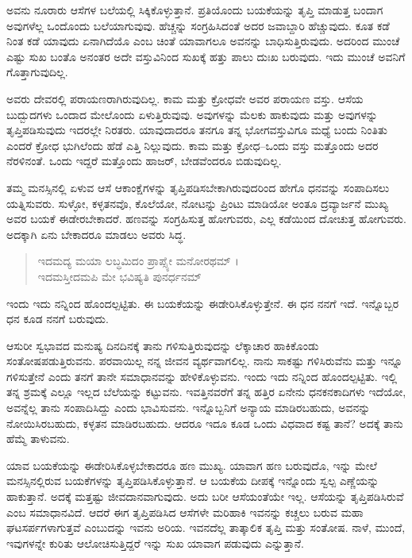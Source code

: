 ಅವನು ನೂರಾರು ಆಸೆಗಳ ಬಲೆಯಲ್ಲಿ ಸಿಕ್ಕಿಕೊಳ್ಳುತ್ತಾನೆ. ಪ್ರತಿಯೊಂದು ಬಯಕೆಯನ್ನು ತೃಪ್ತಿ ಮಾಡುತ್ತ ಬಂದಾಗ ಅವುಗಳೆಲ್ಲ ಒಂದೊಂದು ಬಲೆಯಾಗುವುವು. ಹೆಚ್ಚನ್ನು ಸಂಗ್ರಹಿಸಿದಂತೆ ಅದರ ಜವಾಬ್ದಾರಿ ಹೆಚ್ಚುವುದು. ಕೂತ ಕಡೆ ನಿಂತ ಕಡೆ ಯಾವುದು ಏನಾಗಿದೆಯೊ ಎಂಬ ಚಿಂತೆ ಯಾವಾಗಲೂ ಅವನನ್ನು ಬಾಧಿಸುತ್ತಿರುವುದು. ಅದರಿಂದ ಮುಂಚೆ ಎಷ್ಟು ಸುಖ ಬಂತೊ ಅನಂತರ ಅದೇ ವಸ್ತುವಿನಿಂದ ಸುಖಕ್ಕೆ ಹತ್ತು ಪಾಲು ದುಃಖ ಬರುವುದು. ಇದು ಮುಂಚೆ ಅವನಿಗೆ ಗೊತ್ತಾಗುವುದಿಲ್ಲ.

ಅವರು ದೇವರಲ್ಲಿ ಪರಾಯಣರಾಗಿರುವುದಿಲ್ಲ. ಕಾಮ ಮತ್ತು ಕ್ರೋಧವೇ ಅವರ ಪರಾಯಣ ವಸ್ತು. ಆಸೆಯ ಬುದ್ಬುದಗಳು ಒಂದಾದ ಮೇಲೊಂದು ಏಳುತ್ತಿರುವುವು. ಅವುಗಳನ್ನು ಮೆಲಕು ಹಾಕುವುದು ಮತ್ತು ಅವುಗಳನ್ನು ತೃಪ್ತಿಪಡಿಸುವುದು ಇದರಲ್ಲೇ ನಿರತರು. ಯಾವುದಾದರೂ ತನಗೂ ತನ್ನ ಭೋಗವಸ್ತುವಿಗೂ ಮಧ್ಯೆ ಬಂದು ನಿಂತಿತು ಎಂದರೆ ಕ್ರೋಧ ಭುಗಿಲೆಂದು ಹೆಡೆ ಎತ್ತಿ ನಿಲ್ಲುವುದು. ಕಾಮ ಮತ್ತು ಕ್ರೋಧ–ಒಂದು ವಸ್ತು ಮತ್ತೊಂದು ಅದರ ನೆರಳಿನಂತೆ. ಒಂದು ಇದ್ದರೆ ಮತ್ತೊಂದು ಹಾಜರ್, ಬೇಡವೆಂದರೂ ಬಿಡುವುದಿಲ್ಲ.

ತಮ್ಮ ಮನಸ್ಸಿನಲ್ಲಿ ಏಳುವ ಆಸೆ ಆಕಾಂಕ್ಷೆಗಳನ್ನು ತೃಪ್ತಿಪಡಿಸಬೇಕಾಗಿರುವುದರಿಂದ ಹೇಗೊ ಧನವನ್ನು ಸಂಪಾದಿಸಲು ಯತ್ನಿಸುವರು. ಸುಳ್ಳೋ, ಕಳ್ಳತನವೊ, ಕೊಲೆಯೋ, ನೋಟನ್ನು ಪ್ರಿಂಟು ಮಾಡಿಯೋ ಅಂತೂ ದ್ರವ್ಯಾರ್ಜನೆ ಮುಖ್ಯ ಅವರ ಬಯಕೆ ಈಡೇರಬೇಕಾದರೆ. ಹಣವನ್ನು ಸಂಗ್ರಹಿಸುತ್ತ ಹೋಗುವರು, ಎಲ್ಲ ಕಡೆಯಿಂದ ದೋಚುತ್ತ ಹೋಗುವರು. ಅದಕ್ಕಾಗಿ ಏನು ಬೇಕಾದರೂ ಮಾಡಲು ಅವರು ಸಿದ್ಧ.

\begin{verse}
ಇದಮದ್ಯ ಮಯಾ ಲಬ್ಧಮಿದಂ ಪ್ರಾಪ್ಸ್ಯೇ ಮನೋರಥಮ್ ।\\ಇದಮಸ್ತೀದಮಪಿ ಮೇ ಭವಿಷ್ಯತಿ ಪುನರ್ಧನಮ್ 
\end{verse}

{\small ಇಂದು ಇದು ನನ್ನಿಂದ ಹೊಂದಲ್ಪಟ್ಟಿತು. ಈ ಬಯಕೆಯನ್ನು ಈಡೇರಿಸಿಕೊಳ್ಳುತ್ತೇನೆ. ಈ ಧನ ನನಗೆ ಇದೆ. ಇನ್ನೊಬ್ಬರ ಧನ ಕೂಡ ನನಗೆ ಬರುವುದು.}

ಆಸುರೀ ಸ್ವಭಾವದ ಮನುಷ್ಯ ದಿನದಿನಕ್ಕೆ ತಾನು ಗಳಿಸುತ್ತಿರುವುದನ್ನು ಲೆಕ್ಕಾಚಾರ ಹಾಕಿಕೊಂಡು ಸಂತೋಷಪಡುತ್ತಿರುವನು. ಪರವಾಯಿಲ್ಲ ನನ್ನ ಜೀವನ ವ್ಯರ್ಥವಾಗಲಿಲ್ಲ. ನಾನು ಸಾಕಷ್ಟು ಗಳಿಸಿರುವೆನು ಮತ್ತು ಇನ್ನೂ ಗಳಿಸುತ್ತೇನೆ ಎಂದು ತನಗೆ ತಾನೇ ಸಮಾಧಾನವನ್ನು ಹೇಳಿಕೊಳ್ಳುವನು. ಇಂದು ಇದು ನನ್ನಿಂದ ಹೊಂದಲ್ಪಟ್ಟಿತು. ಇಲ್ಲಿ ತನ್ನ ಶ್ರಮಕ್ಕೆ ಎಲ್ಲೂ ಇಲ್ಲದ ಬೆಲೆಯನ್ನು ಕಟ್ಟುವನು. ಇವತ್ತಿನವರೆಗೆ ತನ್ನ ಹತ್ತಿರ ಏನೇನು ಧನಕನಕಾದಿಗಳು ಇದೆಯೋ, ಅವನ್ನೆಲ್ಲ ತಾನು ಸಂಪಾದಿಸಿದ್ದು ಎಂದು ಭಾವಿಸುವನು. ಇನ್ನೊಬ್ಬನಿಗೆ ಅನ್ಯಾಯ ಮಾಡಿರಬಹುದು, ಅವನನ್ನು ನೋಯಿಸಿರಬಹುದು, ಕಳ್ಳತನ ಮಾಡಿರಬಹುದು. ಆದರೂ ಇದೂ ಕೂಡ ಒಂದು ವಿಧವಾದ ಕಷ್ಟ ತಾನೆ? ಅದಕ್ಕೆ ತಾನು ಹೆಮ್ಮೆ ತಾಳುವನು.

ಯಾವ ಬಯಕೆಯನ್ನು ಈಡೇರಿಸಿಕೊಳ್ಳಬೇಕಾದರೂ ಹಣ ಮುಖ್ಯ. ಯಾವಾಗ ಹಣ ಬರುವುದೊ, ಇನ್ನು ಮೇಲೆ ಮನಸ್ಸಿನಲ್ಲಿರುವ ಬಯಕೆಗಳನ್ನು ತೃಪ್ತಿಪಡಿಸಿಕೊಳ್ಳುತ್ತಾನೆ. ಆ ಬಯಕೆಯ ದೀಪಕ್ಕೆ ಇನ್ನೊಂದು ಸ್ವಲ್ಪ ಎಣ್ಣೆಯನ್ನು ಹಾಕುತ್ತಾನೆ. ಅದಕ್ಕೆ ಮತ್ತಷ್ಟು ಜೀವದಾನವಾಗುವುದು. ಅದು ಬರೀ ಆಸೆಯಂತೆಯೇ ಇಲ್ಲ. ಆಸೆಯನ್ನು ತೃಪ್ತಿಪಡಿಸಿರುವೆ ಎಂಬ ಸಮಾಧಾನವಿದೆ. ಆದರೆ ಈಗ ತೃಪ್ತಿಪಡಿಸಿದ ಆಸೆಗಳೇ ಮರಿಹಾಕಿ ಇವನನ್ನು ಕಚ್ಚಲು ಬರುವ ಮಹಾ ಘಟಸರ್ಪಗಳಾಗುತ್ತವೆ ಎಂಬುದನ್ನು ಇವನು ಅರಿಯ. ಇವನದೆಲ್ಲ ತಾತ್ಕಾಲಿಕ ತೃಪ್ತಿ ಮತ್ತು ಸಂತೋಷ. ನಾಳೆ, ಮುಂದೆ, ಇವುಗಳನ್ನೇ ಕುರಿತು ಆಲೋಚಿಸುತ್ತಿದ್ದರೆ ಇನ್ನು ಸುಖ ಯಾವಾಗ ಪಡುವುದು ಎನ್ನುತ್ತಾನೆ.

